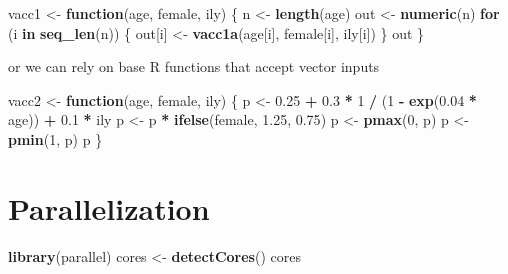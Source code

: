 \documentclass[]{book}
\newenvironment{Shaded}{\begin{snugshade}}{\end{snugshade}}
\newcommand{\KeywordTok}[1]{\textcolor[rgb]{0.13,0.29,0.53}{\textbf{#1}}}
\newcommand{\DecValTok}[1]{\textcolor[rgb]{0.00,0.00,0.81}{#1}}
\newcommand{\FloatTok}[1]{\textcolor[rgb]{0.00,0.00,0.81}{#1}}
\newcommand{\StringTok}[1]{\textcolor[rgb]{0.31,0.60,0.02}{#1}}
\newcommand{\ControlFlowTok}[1]{\textcolor[rgb]{0.13,0.29,0.53}{\textbf{#1}}}
\newcommand{\OperatorTok}[1]{\textcolor[rgb]{0.81,0.36,0.00}{\textbf{#1}}}
\newcommand{\NormalTok}[1]{#1}
\theoremstyle{definition}
\theoremstyle{definition}
\theoremstyle{definition}
\theoremstyle{remark}
\begin{document}
\begin{Shaded}
\begin{Highlighting}[]
\NormalTok{vacc1 <-}\StringTok{ }\ControlFlowTok{function}\NormalTok{(age, female, ily) \{}
\NormalTok{  n <-}\StringTok{ }\KeywordTok{length}\NormalTok{(age)}
\NormalTok{  out <-}\StringTok{ }\KeywordTok{numeric}\NormalTok{(n)}
  \ControlFlowTok{for}\NormalTok{ (i }\ControlFlowTok{in} \KeywordTok{seq_len}\NormalTok{(n)) \{}
\NormalTok{    out[i] <-}\StringTok{ }\KeywordTok{vacc1a}\NormalTok{(age[i], female[i], ily[i])}
\NormalTok{  \}}
\NormalTok{  out}
\NormalTok{\}}
\end{Highlighting}
\end{Shaded}

or we can rely on base R functions that accept vector inputs

\begin{Shaded}
\begin{Highlighting}[]
\NormalTok{vacc2 <-}\StringTok{ }\ControlFlowTok{function}\NormalTok{(age, female, ily) \{}
\NormalTok{  p <-}\StringTok{ }\FloatTok{0.25} \OperatorTok{+}\StringTok{ }\FloatTok{0.3} \OperatorTok{*}\StringTok{ }\DecValTok{1} \OperatorTok{/}\StringTok{ }\NormalTok{(}\DecValTok{1} \OperatorTok{-}\StringTok{ }\KeywordTok{exp}\NormalTok{(}\FloatTok{0.04} \OperatorTok{*}\StringTok{ }\NormalTok{age)) }\OperatorTok{+}\StringTok{ }\FloatTok{0.1} \OperatorTok{*}\StringTok{ }\NormalTok{ily}
\NormalTok{  p <-}\StringTok{ }\NormalTok{p }\OperatorTok{*}\StringTok{ }\KeywordTok{ifelse}\NormalTok{(female, }\FloatTok{1.25}\NormalTok{, }\FloatTok{0.75}\NormalTok{)}
\NormalTok{  p <-}\StringTok{ }\KeywordTok{pmax}\NormalTok{(}\DecValTok{0}\NormalTok{, p)}
\NormalTok{  p <-}\StringTok{ }\KeywordTok{pmin}\NormalTok{(}\DecValTok{1}\NormalTok{, p)}
\NormalTok{  p}
\NormalTok{\}}
\end{Highlighting}
\end{Shaded}

\section{Parallelization}\label{parallelization}

\begin{Shaded}
\begin{Highlighting}[]
\KeywordTok{library}\NormalTok{(parallel)}
\NormalTok{cores <-}\StringTok{ }\KeywordTok{detectCores}\NormalTok{()}
\NormalTok{cores}
\end{Highlighting}
\end{Shaded}
\end{document}
